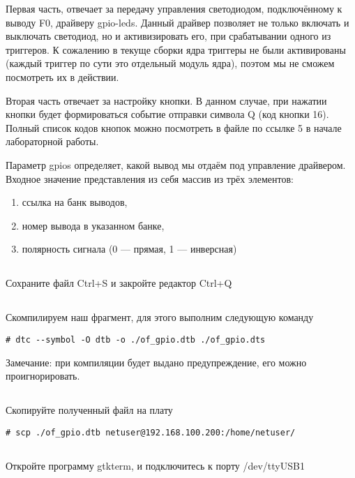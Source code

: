 Первая часть, отвечает за передачу управления светодиодом, подключённому к выводу F0, драйверу gpio-leds. Данный драйвер позволяет не только включать и выключать светодиод, но и активизировать его, при срабатывании одного из триггеров. К сожалению в текуще сборки ядра триггеры не были активированы (каждый триггер по сути это отдельный модуль ядра), поэтом мы не сможем посмотреть их в действии.

Вторая часть отвечает за настройку кнопки. В данном случае, при нажатии кнопки будет формироваться событие отправки символа Q (код кнопки 16). Полный список кодов кнопок можно посмотреть в файле по ссылке 5 в начале лабораторной работы.

Параметр gpios определяет, какой вывод мы отдаём под управление драйвером. Входное значение представления из себя массив из трёх элементов:
\begin{enumerate}
	\item ссылка на банк выводов,
	\item номер вывода в указанном банке,
	\item полярность сигнала (0 — прямая, 1 — инверсная)
\end{enumerate}

\subsection{}Сохраните файл Ctrl+S и закройте редактор Ctrl+Q

\subsection{}Скомпилируем наш фрагмент, для этого выполним следующую команду 
\begin{lstlisting}[style=bash]
# dtc --symbol -O dtb -o ./of_gpio.dtb ./of_gpio.dts
\end{lstlisting}
Замечание: при компиляции будет выдано предупреждение, его можно проигнорировать.

\subsection{}Скопируйте полученный файл на плату
\begin{lstlisting}[style=bash]
# scp ./of_gpio.dtb netuser@192.168.100.200:/home/netuser/
\end{lstlisting}

\subsection{}Откройте программу gtkterm, и подключитесь к порту /dev/ttyUSB1

